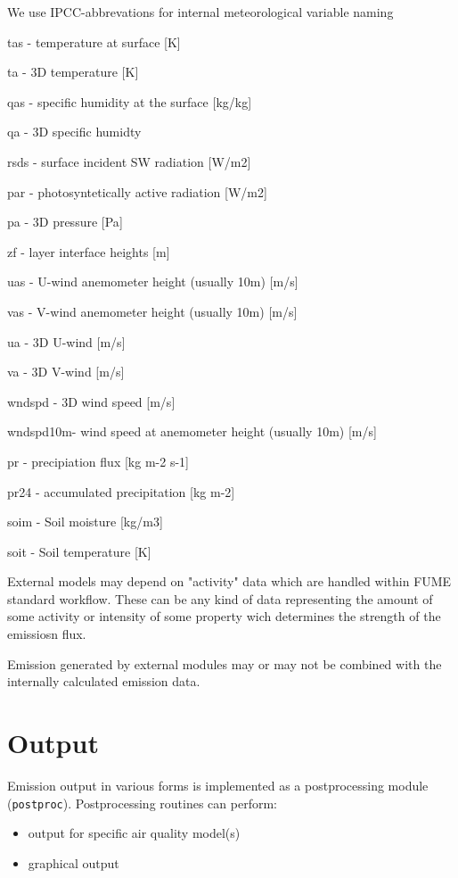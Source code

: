 \documentclass[a4paper,11pt]{article}
\begin{document}
We use IPCC-abbrevations for internal meteorological variable naming 
\itemize
\item tas - temperature at surface {[}K{]} 
\item ta - 3D temperature {[}K{]} 
\item qas - specific humidity at the surface {[}kg/kg{]}
\item qa - 3D specific humidty
\item rsds - surface incident SW radiation {[}W/m2{]}
\item par - photosyntetically active radiation {[}W/m2{]} 
\item pa - 3D pressure {[}Pa{]} 
\item zf - layer interface heights {[}m{]} 
\item uas - U-wind anemometer height (usually 10m) {[}m/s{]} 
\item vas - V-wind anemometer height (usually 10m) {[}m/s{]} 
\item ua - 3D U-wind {[}m/s{]} 
\item va - 3D V-wind {[}m/s{]} 
\item wndspd - 3D wind speed {[}m/s{]}
\item wndspd10m- wind speed at anemometer height (usually 10m) {[}m/s{]} 
\item pr - precipiation flux {[}kg m-2 s-1{]} 
\item pr24 - accumulated precipitation {[}kg m-2{]} 
\item soim - Soil moisture {[}kg/m3{]}
\item soit - Soil temperature {[}K{]}


External models may depend on "activity" data which are handled within FUME standard workflow. These can be any kind of data representing the amount of some activity or intensity of some property wich determines the strength of the emissiosn flux.

Emission generated by external modules may or may not be combined with the internally calculated emission data.

\section{Output}\label{output}

Emission output in various forms is implemented as a postprocessing
module (\texttt{postproc}). Postprocessing routines can perform:

\begin{itemize}
\item
  output for specific air quality model(s)
\item
  graphical output
\end{itemize}
\end{document}
